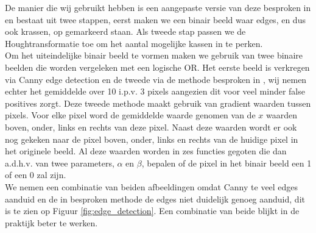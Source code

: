 \documentclass[titlepage]{article}
\begin{document}
De manier die wij gebruikt hebben is een aangepaste versie van deze besproken in \cite{scratch_detection} en bestaat uit twee stappen, eerst maken we een binair beeld waar edges, en dus ook krassen, op gemarkeerd staan. Als tweede stap passen we de Houghtransformatie toe om het aantal mogelijke kassen in te perken.\\
Om het uiteindelijke binair beeld te vormen maken we gebruik van twee binaire beelden die worden vergeleken met een logische OR. Het eerste beeld is verkregen via Canny edge detection en de tweede via de methode besproken in \cite{scratch_detection}, wij nemen echter het gemiddelde over 10 i.p.v. 3 pixels aangezien dit voor veel minder false positives zorgt.
Deze tweede methode maakt gebruik van gradient waarden tussen pixels. Voor elke pixel word de gemiddelde waarde genomen van de $x$ waarden boven, onder, links en rechts van deze pixel. Naast deze waarden wordt er ook nog gekeken naar de pixel boven, onder, links en rechts van de huidige pixel in het originele beeld. Al deze waarden worden in zes functies gegoten die dan a.d.h.v. van twee parameters, $\alpha$ en $\beta$, bepalen of de pixel in het binair beeld een 1 of een 0 zal zijn.\\
We nemen een combinatie van beiden afbeeldingen omdat Canny te veel edges aanduid en de in \cite{scratch_detection} besproken methode de edges niet duidelijk genoeg aanduid, dit is te zien op Figuur \ref{fig:edge_detection}. Een combinatie van beide blijkt in de praktijk beter te werken.\\
\end{document}
